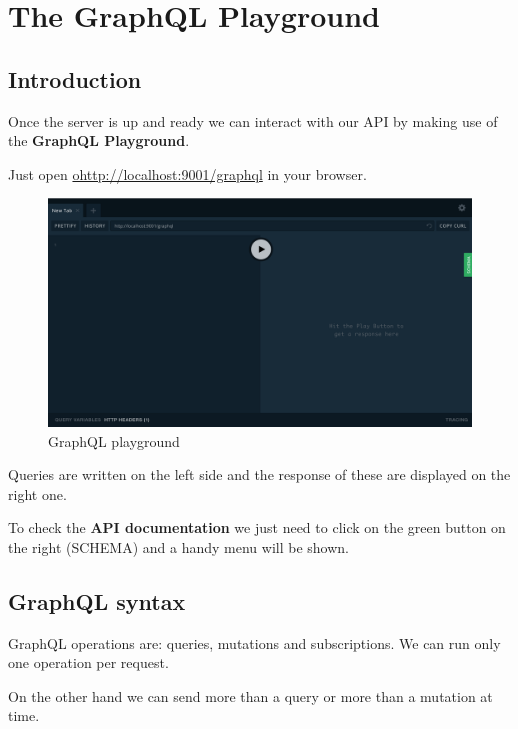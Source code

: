 \documentclass[]{book}
\begin{document}
\chapter{The GraphQL Playground}\label{the-graphql-playground}

\section{Introduction}\label{introduction}

Once the server is up and ready we can interact with our API by making
use of the \textbf{GraphQL Playground}.

Just open
\href{http://localhost:9001/graphql}{ohttp://localhost:9001/graphql} in
your browser.

\begin{figure}
\centering
\includegraphics{assets/playground.png}
\caption{GraphQL playground}
\end{figure}

Queries are written on the left side and the response of these are
displayed on the right one.

To check the \textbf{API documentation} we just need to click on the
green button on the right (SCHEMA) and a handy menu will be shown.

\section{GraphQL syntax}\label{graphql-syntax}

GraphQL operations are: queries, mutations and subscriptions. We can run
only one operation per request.

On the other hand we can send more than a query or more than a mutation
at time.
\end{document}
